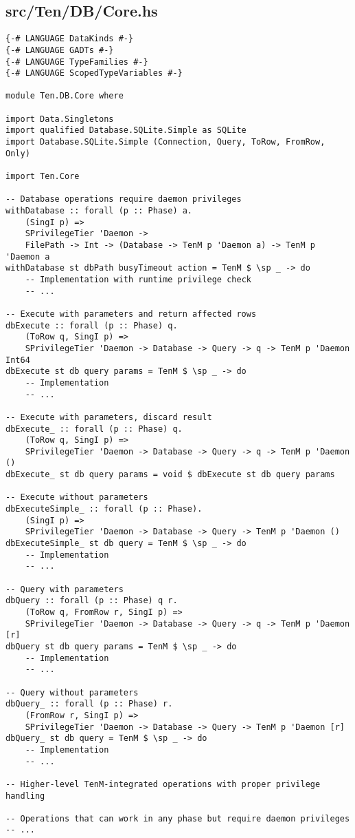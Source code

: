 \documentclass{article}
\begin{document}
\subsection{src/Ten/DB/Core.hs}

\begin{tcolorbox}[title=Ten/DB/Core.hs Changes]
\begin{verbatim}
{-# LANGUAGE DataKinds #-}
{-# LANGUAGE GADTs #-}
{-# LANGUAGE TypeFamilies #-}
{-# LANGUAGE ScopedTypeVariables #-}

module Ten.DB.Core where

import Data.Singletons
import qualified Database.SQLite.Simple as SQLite
import Database.SQLite.Simple (Connection, Query, ToRow, FromRow, Only)

import Ten.Core

-- Database operations require daemon privileges
withDatabase :: forall (p :: Phase) a.
    (SingI p) =>
    SPrivilegeTier 'Daemon ->
    FilePath -> Int -> (Database -> TenM p 'Daemon a) -> TenM p 'Daemon a
withDatabase st dbPath busyTimeout action = TenM $ \sp _ -> do
    -- Implementation with runtime privilege check
    -- ...

-- Execute with parameters and return affected rows
dbExecute :: forall (p :: Phase) q.
    (ToRow q, SingI p) =>
    SPrivilegeTier 'Daemon -> Database -> Query -> q -> TenM p 'Daemon Int64
dbExecute st db query params = TenM $ \sp _ -> do
    -- Implementation
    -- ...

-- Execute with parameters, discard result
dbExecute_ :: forall (p :: Phase) q.
    (ToRow q, SingI p) =>
    SPrivilegeTier 'Daemon -> Database -> Query -> q -> TenM p 'Daemon ()
dbExecute_ st db query params = void $ dbExecute st db query params

-- Execute without parameters
dbExecuteSimple_ :: forall (p :: Phase).
    (SingI p) =>
    SPrivilegeTier 'Daemon -> Database -> Query -> TenM p 'Daemon ()
dbExecuteSimple_ st db query = TenM $ \sp _ -> do
    -- Implementation
    -- ...

-- Query with parameters
dbQuery :: forall (p :: Phase) q r.
    (ToRow q, FromRow r, SingI p) =>
    SPrivilegeTier 'Daemon -> Database -> Query -> q -> TenM p 'Daemon [r]
dbQuery st db query params = TenM $ \sp _ -> do
    -- Implementation
    -- ...

-- Query without parameters
dbQuery_ :: forall (p :: Phase) r.
    (FromRow r, SingI p) =>
    SPrivilegeTier 'Daemon -> Database -> Query -> TenM p 'Daemon [r]
dbQuery_ st db query = TenM $ \sp _ -> do
    -- Implementation
    -- ...

-- Higher-level TenM-integrated operations with proper privilege handling

-- Operations that can work in any phase but require daemon privileges
-- ...
\end{verbatim}
\end{tcolorbox}
\end{document}

